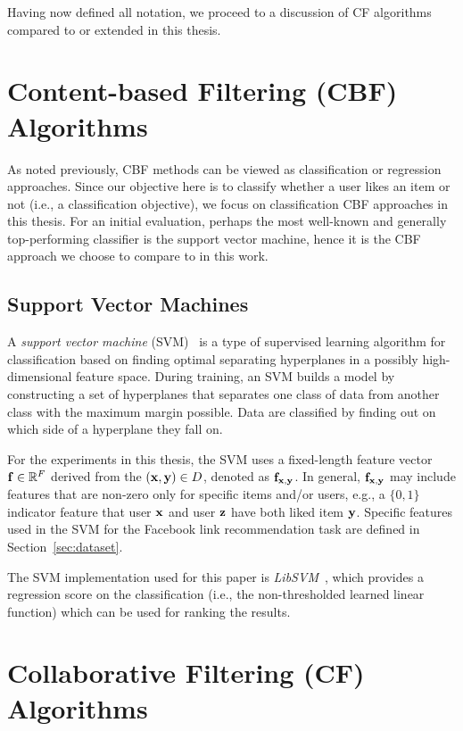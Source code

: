 Having now defined all notation, we proceed to a discussion of
CF algorithms compared to or extended in this thesis.

\section{Content-based Filtering (CBF) Algorithms}

As noted previously, CBF methods can be viewed as classification
or regression approaches.  Since our objective here is to classify
whether a user likes an item or not (i.e., a classification objective),
we focus on classification CBF approaches in this thesis.  For
an initial evaluation, perhaps the most well-known and generally
top-performing classifier is the support vector machine, hence it is
the CBF approach we choose to compare to in this work.

\subsection{Support Vector Machines}
\label{sec:svm}

A \emph{support vector machine} (SVM)~\cite{svms} is a type of supervised
learning algorithm for classification based on finding optimal separating
hyperplanes in a possibly high-dimensional feature space.  During
training, an SVM builds a model by constructing a set of hyperplanes
that separates one class of data from another class with the maximum
margin possible.  Data are classified by finding out on which side of
a hyperplane they fall on.

For the experiments in this thesis, the SVM uses a fixed-length
feature vector $\mathbf{f} \in \mathbb{R}^F$ derived from the $(\mathbf{x},\mathbf{y}) \in D$,
denoted as $\mathbf{f}_{\mathbf{x},\mathbf{y}}$.  
In general, $\mathbf{f}_{\mathbf{x},\mathbf{y}}$ may include features that are
non-zero only for specific items and/or users, e.g., a $\{0,1\}$
indicator feature that user $\mathbf{x}$ and user $\mathbf{z}$ have both liked item
$\mathbf{y}$.  Specific features used in the SVM for the Facebook link recommendation
task are defined in Section~\ref{sec:dataset}.

The SVM implementation used for this paper is
\emph{LibSVM}~\cite{libsvm}, which provides a regression score on the
classification (i.e., the non-thresholded learned linear function) 
which can be used for ranking the results.

\section{Collaborative Filtering (CF) Algorithms}

